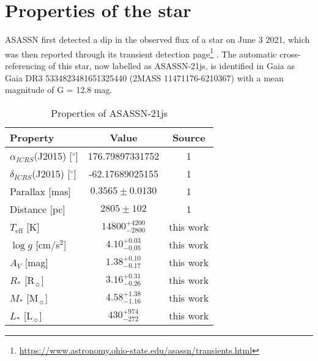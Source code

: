 \documentclass[letter]{aa} %
\begin{document}
\section{Properties of the star}\label{sec:star}

ASASSN first detected a dip in the observed flux of a star on June 3 2021, which was then reported through its transient detection page\footnote{\url{https://www.astronomy.ohio-state.edu/asassn/transients.html}} \citep{Shappee14}.
%
The automatic cross-referencing of this star, now labelled as ASASSN-21js, is identified in Gaia as Gaia DR3 5334823481651325440 (2MASS 11471176-6210367) with a mean magnitude of G = 12.8 mag.
%

\begin{table}
\caption{Properties of ASASSN-21js}              %
\label{table:asassn-21js-param}      %
\centering                                      %
\begin{tabular}{l c c}          %
\hline\hline                        %
\textbf{Property} & \textbf{Value} & \textbf{Source} \\    %
\hline                                   %
 $\alpha_{ICRS}$(J2015) [$^\circ$] & 176.79897331752 & 1 \\
 $\delta_{ICRS}$(J2015) [$^\circ$] & -62.17689025155 & 1 \\
 Parallax [mas] & $0.3565 \pm 0.0130$ & 1 \\
 Distance [pc] & $2805 \pm 102$ & 1 \\
    $T_{\mathrm{eff}}$ [K] & $14800^{+4200}_{-2800}$ & this work \\
    $\log g$ [cm/s$^2$] & $4.10^{+0.03}_{-0.05}$ & this work \\
    $A_V$ [mag] & $1.38^{+0.10}_{-0.17}$ & this work \\
    $R_*$ [R$_\sun$] & $3.16^{+0.31}_{-0.26}$ & this work \\
    $M_*$ [M$_\sun$]& $4.58^{+1.38}_{-1.16}$ & this work \\
    $L_*$ [L$_\sun$]& $430^{+974}_{-272}$ & this work \\
    \hline     
\end{tabular}
\end{table}

\label{sec:SED_fit}
\end{document}
